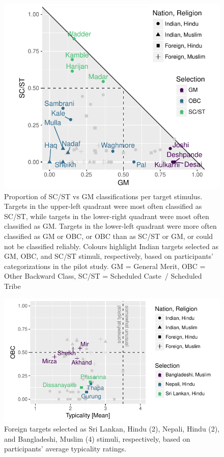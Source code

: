 \documentclass[12pt, a4paper]{article}
\begin{document}
\begin{figure}
\centering
\includegraphics[scale=1]{../figures/appendices/appendices-a-1}
\caption[Proportion of SC/ST vs GM classifications per target stimulus (Pilot study)]{Proportion of SC/ST vs GM classifications per target stimulus. Targets in the upper-left quadrant were most often classified as SC/ST, while targets in the lower-right quadrant were most often classified as GM. Targets in the lower-left quadrant were more often classified as GM or OBC, or OBC than as SC/ST or GM, or could not be classified reliably. Colours highlight Indian targets selected as GM, OBC, and SC/ST stimuli, respectively, based on participants' categorizations in the pilot study. GM = General Merit, OBC = Other Backward Class, SC/ST = Scheduled Caste~/ Scheduled Tribe}
\label{fig:a-1}
\end{figure}

\begin{figure}
\centering
\includegraphics[scale=1]{../figures/appendices/appendices-a-2}
\caption[Foreign targets selected based on participants' average typicality ratings (Pilot study)]{Foreign targets selected as Sri Lankan, Hindu (2), Nepali, Hindu (2), and Bangladeshi, Muslim (4) stimuli, respectively, based on participants' average typicality ratings.}
\label{fig:a-2}
\end{figure}
\end{document}
